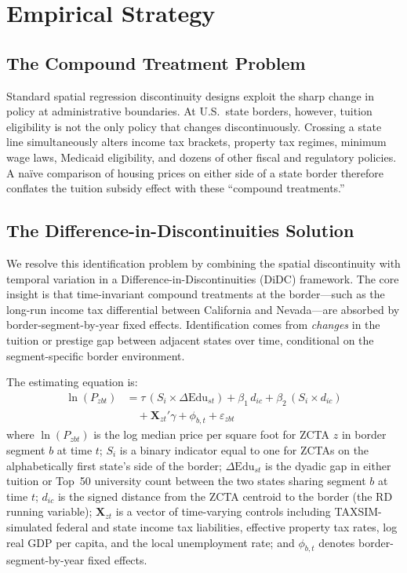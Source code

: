 \documentclass[12pt]{article}
\begin{document}
\section{Empirical Strategy}\label{sec:strategy}

\subsection{The Compound Treatment Problem}

Standard spatial regression discontinuity designs exploit the sharp change in policy at administrative boundaries. At U.S.\ state borders, however, tuition eligibility is not the only policy that changes discontinuously. Crossing a state line simultaneously alters income tax brackets, property tax regimes, minimum wage laws, Medicaid eligibility, and dozens of other fiscal and regulatory policies. A na\"ive comparison of housing prices on either side of a state border therefore conflates the tuition subsidy effect with these ``compound treatments.''

\subsection{The Difference-in-Discontinuities Solution}

We resolve this identification problem by combining the spatial discontinuity with temporal variation in a Difference-in-Discontinuities (DiDC) framework. The core insight is that time-invariant compound treatments at the border---such as the long-run income tax differential between California and Nevada---are absorbed by border-segment-by-year fixed effects. Identification comes from \textit{changes} in the tuition or prestige gap between adjacent states over time, conditional on the segment-specific border environment.

The estimating equation is:
\begin{align}
\ln(P_{zbt}) &= \tau \, (S_i \times \Delta\text{Edu}_{st}) + \beta_1 \, d_{ic} + \beta_2 \, (S_i \times d_{ic}) \nonumber \\
&\quad + \mathbf{X}_{zt}'\gamma + \phi_{b,t} + \varepsilon_{zbt} \label{eq:didc}
\end{align}
where $\ln(P_{zbt})$ is the log median price per square foot for ZCTA $z$ in border segment $b$ at time $t$; $S_i$ is a binary indicator equal to one for ZCTAs on the alphabetically first state's side of the border; $\Delta\text{Edu}_{st}$ is the dyadic gap in either tuition or Top~50 university count between the two states sharing segment $b$ at time $t$; $d_{ic}$ is the signed distance from the ZCTA centroid to the border (the RD running variable); $\mathbf{X}_{zt}$ is a vector of time-varying controls including TAXSIM-simulated federal and state income tax liabilities, effective property tax rates, log real GDP per capita, and the local unemployment rate; and $\phi_{b,t}$ denotes border-segment-by-year fixed effects.
\end{document}
